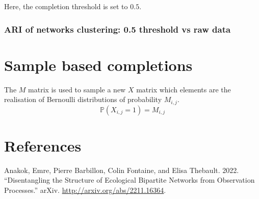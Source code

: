 \documentclass[
]{article}
\newlength{\cslhangindent}
\newenvironment{cslreferences}%
  {\setlength{\parindent}{0pt}%
  \everypar{\setlength{\hangindent}{\cslhangindent}}\ignorespaces}%
  {\par}
\begin{document}
Here, the completion threshold is set to \(0.5\).

\hypertarget{ari-of-networks-clustering-0.5-threshold-vs-raw-data}{%
\subsubsection{ARI of networks clustering: 0.5 threshold vs raw
data}\label{ari-of-networks-clustering-0.5-threshold-vs-raw-data}}

\hypertarget{sample-based-completions}{%
\section{Sample based completions}\label{sample-based-completions}}

The \(M\) matrix is used to sample a new \(X\) matrix which elements are
the realisation of Bernoulli distributions of probability \(M_{i,j}\).
\[\mathbb{P}(X_{i,j} = 1) = M_{i,j} \]

\hypertarget{references}{%
\section*{References}\label{references}}

\hypertarget{refs}{}
\begin{cslreferences}
\leavevmode\hypertarget{ref-anakokDisentanglingStructureEcological2022}{}%
Anakok, Emre, Pierre Barbillon, Colin Fontaine, and Elisa Thebault.
2022. ``Disentangling the Structure of Ecological Bipartite Networks
from Observation Processes.'' arXiv.
\url{http://arxiv.org/abs/2211.16364}.
\end{cslreferences}
\end{document}
